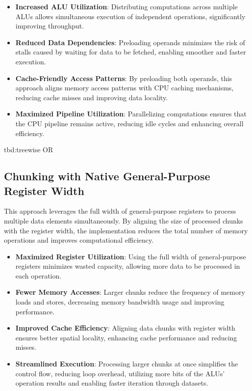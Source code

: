 \documentclass{article}
\begin{document}
\begin{itemize}
  \item \textbf{Increased ALU Utilization}: Distributing computations across multiple ALUs allows simultaneous execution of independent operations, significantly improving throughput.
  \item \textbf{Reduced Data Dependencies}: Preloading operands minimizes the risk of stalls caused by waiting for data to be fetched, enabling smoother and faster execution.
  \item \textbf{Cache-Friendly Access Patterns}: By preloading both operands, this approach aligns memory access patterns with CPU caching mechanisms, reducing cache misses and improving data locality.
  \item \textbf{Maximized Pipeline Utilization}: Parallelizing computations ensures that the CPU pipeline remains active, reducing idle cycles and enhancing overall efficiency.
\end{itemize}

tbd:treewise OR

\subsection{Chunking with Native General-Purpose Register Width}

This approach leverages the full width of general-purpose registers to process multiple data elements simultaneously. By aligning the size of processed chunks with the register width, the implementation reduces the total number of memory operations and improves computational efficiency.

\begin{itemize}
  \item \textbf{Maximized Register Utilization}: Using the full width of general-purpose registers minimizes wasted capacity, allowing more data to be processed in each operation.
  \item \textbf{Fewer Memory Accesses}: Larger chunks reduce the frequency of memory loads and stores, decreasing memory bandwidth usage and improving performance.
  \item \textbf{Improved Cache Efficiency}: Aligning data chunks with register width ensures better spatial locality, enhancing cache performance and reducing misses.
  \item \textbf{Streamlined Execution}: Processing larger chunks at once simplifies the control flow, reducing loop overhead, utilizing more bits of the ALUs' operation results and enabling faster iteration through datasets.
\end{itemize}
\end{document}
